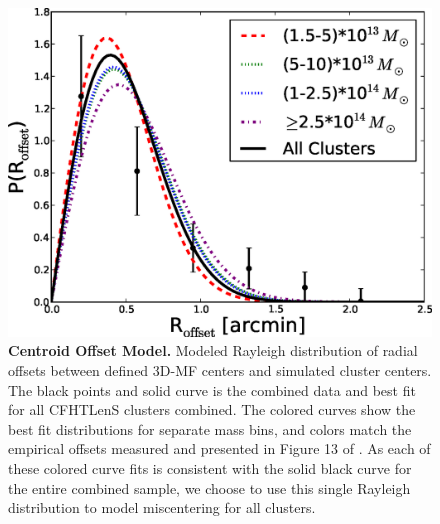 \begin{figure}
\begin{center}
\includegraphics[scale=0.6]{plots_ch3/PofRc_bestfit_python.eps}
\caption[Centroid Offset Model]{{\bf Centroid Offset Model.} Modeled Rayleigh distribution of radial offsets between defined \ac{3D-MF} centers and simulated cluster centers. The black points and solid curve is the combined data and best fit for all \ac{CFHTLenS} clusters combined. The colored curves show the best fit distributions for separate mass bins, and colors match the empirical offsets measured and presented in Figure 13 of \citet{Milkeraitis10}. As each of these colored curve fits is consistent with the solid black curve for the entire combined sample, we choose to use this single Rayleigh distribution to model miscentering for all clusters.}
\label{plot:gauss3}
\end{center}
\end{figure}

